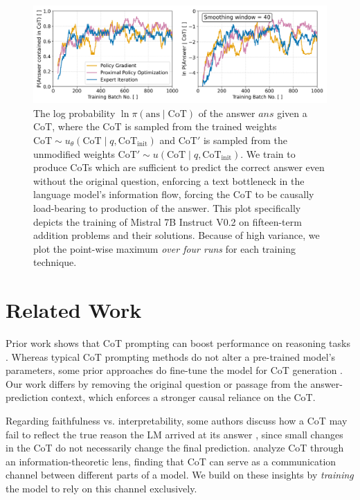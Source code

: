 \documentclass{article}
\begin{document}
\begin{figure}
  \centering
    \includegraphics[width=\textwidth]{Figures/cot_performance_comparison.png}
    \caption{The log probability $\ln \pi(\text{ans} \mid \text{CoT})$ of the answer $ans$ given a $\text{CoT}$, where the $\text{CoT}$ is sampled from the trained weights $\text{CoT} \sim u_\theta(\text{CoT} \mid q, \text{CoT}_{\text{init}})$ and $\text{CoT}'$ is sampled from the unmodified weights $\text{CoT}' \sim u(\text{CoT} \mid q, \text{CoT}_{\text{init}})$. We train to produce CoTs which are sufficient to predict the correct answer even without the original question, enforcing a text bottleneck in the language model's information flow, forcing the CoT to be causally load-bearing to production of the answer. This plot specifically depicts the training of Mistral 7B Instruct V0.2 on fifteen-term addition problems and their solutions. Because of high variance, we plot the point-wise maximum \emph{over four runs} for each training technique.}
    \label{fig:loss}
\end{figure}

\section{Related Work}
\label{sec:related_work}

Prior work shows that CoT prompting can boost performance on reasoning tasks \citep{wei2022chain, nye2022show}.
Whereas typical CoT prompting methods do not alter a pre-trained model's parameters, some prior approaches do fine-tune the model for CoT generation \citep{eric_star2022, zelikman2024quietstar, deepseekai2025}. Our work differs by removing the original question or passage from the answer-prediction context, which enforces a stronger causal reliance on the CoT.

Regarding faithfulness vs. interpretability, some authors discuss how a CoT may fail to reflect the true reason the LM arrived at its answer \citep{lanham2023measuring, turpin2023language}, since small changes in the CoT do not necessarily change the final prediction. \citet{zhou2023understanding} analyze CoT through an information-theoretic lens, finding that CoT can serve as a communication channel between different parts of a model. We build on these insights by \emph{training} the model to rely on this channel exclusively.
\end{document}
